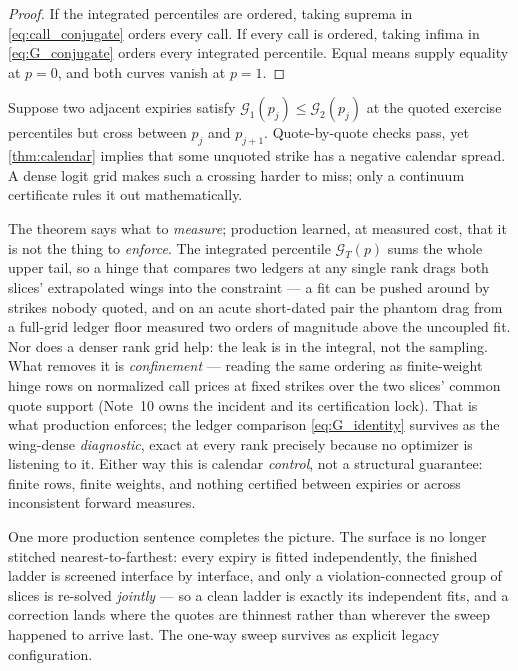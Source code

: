 \documentclass[11pt]{article}
\begin{document}
\begin{proof}
If the integrated percentiles are ordered, taking suprema in
\eqref{eq:call_conjugate} orders every call.  If every call is ordered, taking
infima in \eqref{eq:G_conjugate} orders every integrated percentile.  Equal
means supply equality at $p=0$, and both curves vanish at $p=1$.
\end{proof}

\begin{example}[title={A calendar crossing can hide between strikes}]
\label{ex:calendar}
Suppose two adjacent expiries satisfy
$\mathcal G_1(p_j)\le\mathcal G_2(p_j)$ at the quoted exercise percentiles but
cross between $p_j$ and $p_{j+1}$.  Quote-by-quote checks pass, yet
\cref{thm:calendar} implies that some unquoted strike has a negative calendar
spread.  A dense logit grid makes such a crossing harder to miss; only a
continuum certificate rules it out mathematically.
\end{example}

The theorem says what to \emph{measure}; production learned, at measured
cost, that it is not the thing to \emph{enforce}.  The integrated
percentile $\mathcal G_T(p)$ sums the whole upper tail, so a hinge that
compares two ledgers at any single rank drags both slices' extrapolated
wings into the constraint --- a fit can be pushed around by strikes nobody
quoted, and on an acute short-dated pair the phantom drag from a full-grid
ledger floor measured two orders of magnitude above the uncoupled fit.
Nor does a denser rank grid help: the leak is in the integral, not the
sampling.  What removes it is \emph{confinement} --- reading the same
ordering as finite-weight hinge rows on normalized call prices at fixed
strikes over the two slices' common quote support (Note~10 owns the
incident and its certification lock).  That is what production enforces;
the ledger comparison \eqref{eq:G_identity} survives as the wing-dense
\emph{diagnostic}, exact at every rank precisely because no optimizer is
listening to it.  Either way this is calendar \emph{control}, not a
structural guarantee: finite rows, finite weights, and nothing certified
between expiries or across inconsistent forward measures.

One more production sentence completes the picture.  The surface is no
longer stitched nearest-to-farthest: every expiry is fitted independently,
the finished ladder is screened interface by interface, and only a
violation-connected group of slices is re-solved \emph{jointly} --- so a
clean ladder is exactly its independent fits, and a correction lands where
the quotes are thinnest rather than wherever the sweep happened to arrive
last.  The one-way sweep survives as explicit legacy configuration.
\end{document}
